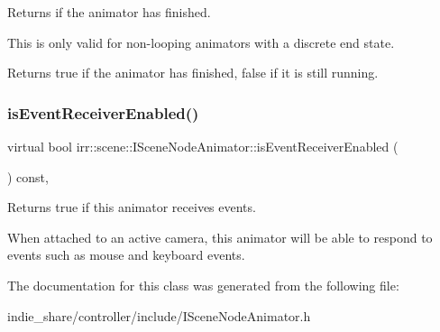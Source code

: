 Returns if the animator has finished. 

This is only valid for non-\/looping animators with a discrete end state. \begin{DoxyReturn}{Returns}
true if the animator has finished, false if it is still running. 
\end{DoxyReturn}
\mbox{\label{classirr_1_1scene_1_1ISceneNodeAnimator_a37b22b8767dc6adca575223f02458740}} 
\subsubsection{\texorpdfstring{is\+Event\+Receiver\+Enabled()}{isEventReceiverEnabled()}}
{\footnotesize\ttfamily virtual bool irr\+::scene\+::\+I\+Scene\+Node\+Animator\+::is\+Event\+Receiver\+Enabled (\begin{DoxyParamCaption}{ }\end{DoxyParamCaption}) const\hspace{0.3cm}{\ttfamily [inline]}, {\ttfamily [virtual]}}



Returns true if this animator receives events. 

When attached to an active camera, this animator will be able to respond to events such as mouse and keyboard events. 

The documentation for this class was generated from the following file\+:\begin{DoxyCompactItemize}
\item 
indie\+\_\+share/controller/include/I\+Scene\+Node\+Animator.\+h\end{DoxyCompactItemize}
